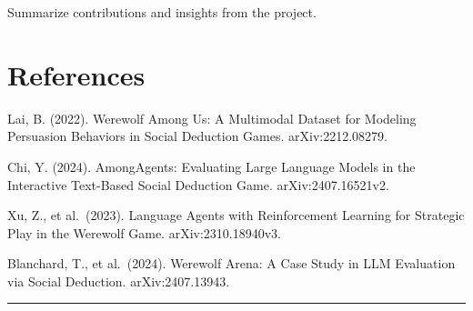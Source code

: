 \documentclass[
  letterpaper,
  DIV=11,
  numbers=noendperiod]{scrreprt}
\begin{document}
Summarize contributions and insights from the project.

\chapter{References}\label{references}

Lai, B. (2022). Werewolf Among Us: A Multimodal Dataset for Modeling
Persuasion Behaviors in Social Deduction Games. arXiv:2212.08279.

Chi, Y. (2024). AmongAgents: Evaluating Large Language Models in the
Interactive Text-Based Social Deduction Game. arXiv:2407.16521v2.

Xu, Z., et al.~(2023). Language Agents with Reinforcement Learning for
Strategic Play in the Werewolf Game. arXiv:2310.18940v3.

Blanchard, T., et al.~(2024). Werewolf Arena: A Case Study in LLM
Evaluation via Social Deduction. arXiv:2407.13943.

\begin{center}\rule{0.5\linewidth}{0.5pt}\end{center}
\end{document}
